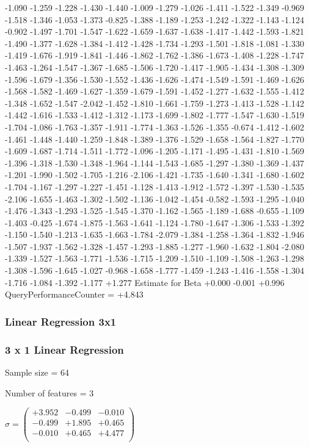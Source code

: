 \documentclass[9pt]{article}
\theoremstyle{plain}
\theoremstyle{definition}
\theoremstyle{remark}
\numberwithin{equation}{section}
\begin{document}
-1.090
-1.259
-1.228
-1.430
-1.440
-1.009
-1.279
-1.026
-1.411
-1.522
-1.349
-0.969
-1.518
-1.346
-1.053
-1.373
-0.825
-1.388
-1.189
-1.253
-1.242
-1.322
-1.143
-1.124
-0.902
-1.497
-1.701
-1.547
-1.622
-1.659
-1.637
-1.638
-1.417
-1.442
-1.593
-1.821
-1.490
-1.377
-1.628
-1.384
-1.412
-1.428
-1.734
-1.293
-1.501
-1.818
-1.081
-1.330
-1.419
-1.676
-1.919
-1.841
-1.446
-1.862
-1.762
-1.386
-1.673
-1.408
-1.228
-1.747
-1.463
-1.264
-1.547
-1.367
-1.685
-1.506
-1.720
-1.417
-1.905
-1.434
-1.308
-1.309
-1.596
-1.679
-1.356
-1.530
-1.552
-1.436
-1.626
-1.474
-1.549
-1.591
-1.469
-1.626
-1.568
-1.582
-1.469
-1.627
-1.359
-1.679
-1.591
-1.452
-1.277
-1.632
-1.555
-1.412
-1.348
-1.652
-1.547
-2.042
-1.452
-1.810
-1.661
-1.759
-1.273
-1.413
-1.528
-1.142
-1.442
-1.616
-1.533
-1.412
-1.312
-1.173
-1.699
-1.802
-1.777
-1.547
-1.630
-1.519
-1.704
-1.086
-1.763
-1.357
-1.911
-1.774
-1.363
-1.526
-1.355
-0.674
-1.412
-1.602
-1.461
-1.448
-1.440
-1.259
-1.848
-1.389
-1.376
-1.529
-1.658
-1.564
-1.827
-1.770
-1.609
-1.687
-1.714
-1.511
-1.772
-1.096
-1.205
-1.171
-1.495
-1.431
-1.810
-1.569
-1.396
-1.318
-1.530
-1.348
-1.964
-1.144
-1.543
-1.685
-1.297
-1.380
-1.369
-1.437
-1.201
-1.990
-1.502
-1.705
-1.216
-2.106
-1.421
-1.735
-1.640
-1.341
-1.680
-1.602
-1.704
-1.167
-1.297
-1.227
-1.451
-1.128
-1.413
-1.912
-1.572
-1.397
-1.530
-1.535
-2.106
-1.655
-1.463
-1.302
-1.502
-1.136
-1.042
-1.454
-0.582
-1.593
-1.295
-1.040
-1.476
-1.343
-1.293
-1.525
-1.545
-1.370
-1.162
-1.565
-1.189
-1.688
-0.655
-1.109
-1.403
-0.425
-1.674
-1.875
-1.563
-1.641
-1.124
-1.780
-1.647
-1.306
-1.533
-1.392
-1.150
-1.540
-1.213
-1.635
-1.663
-1.784
-2.079
-1.384
-1.258
-1.364
-1.832
-1.946
-1.507
-1.937
-1.562
-1.328
-1.457
-1.293
-1.885
-1.277
-1.960
-1.632
-1.804
-2.080
-1.339
-1.527
-1.563
-1.771
-1.536
-1.715
-1.209
-1.510
-1.109
-1.508
-1.263
-1.298
-1.308
-1.596
-1.645
-1.027
-0.968
-1.658
-1.777
-1.459
-1.243
-1.416
-1.558
-1.304
-1.716
-1.084
-1.392
-1.177
+1.277
Estimate for Beta
+0.000
-0.001
+0.996
QueryPerformanceCounter  =  +4.843
\subsubsection{Linear Regression 3x1}
\subsubsection{3 x 1 Linear Regression}
Sample size = 64

Number of features = 3

$\sigma = \left(
\begin{array}{
ccc}
+3.952 & -0.499 & -0.010 \\
-0.499 & +1.895 & +0.465 \\
-0.010 & +0.465 & +4.477 \\
\end{array}
\right)$ \newline 
\end{document}
